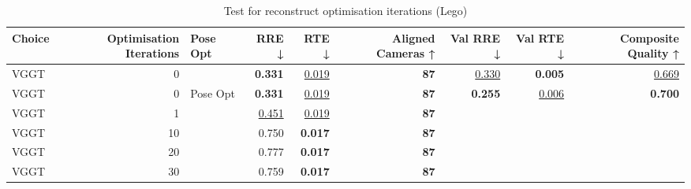 \begin{table}[H]
\caption{Test for reconstruct optimisation iterations (Lego)}
\label{tab:99_optimisation_iterations_lego}
\begin{tabular}{lrlrrrrrr}
\toprule
Choice & Optimisation Iterations & Pose Opt & RRE ↓ & RTE ↓ & Aligned Cameras ↑ & Val RRE ↓ & Val RTE ↓ & Composite Quality ↑ \\
\midrule
VGGT & 0 &  & \textbf{0.331} & \underline{0.019} & \textbf{87} & \underline{0.330} & \textbf{0.005} & \underline{0.669} \\
VGGT & 0 & Pose Opt & \textbf{0.331} & \underline{0.019} & \textbf{87} & \textbf{0.255} & \underline{0.006} & \textbf{0.700} \\
VGGT & 1 &  & \underline{0.451} & \underline{0.019} & \textbf{87} &  &  &  \\
VGGT & 10 &  & 0.750 & \textbf{0.017} & \textbf{87} &  &  &  \\
VGGT & 20 &  & 0.777 & \textbf{0.017} & \textbf{87} &  &  &  \\
VGGT & 30 &  & 0.759 & \textbf{0.017} & \textbf{87} &  &  &  \\
\bottomrule
\end{tabular}
\end{table}
